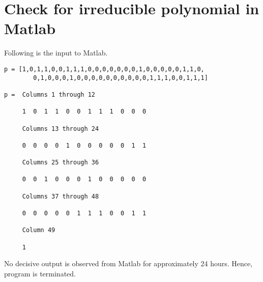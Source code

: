 \chapter{Check for irreducible polynomial in Matlab}
\label{app:appendixA}
Following is the input to Matlab.
 
\begin{lstlisting}[frame=tb]
p = [1,0,1,1,0,0,1,1,1,0,0,0,0,0,0,0,1,0,0,0,0,0,1,1,0,
		0,1,0,0,0,1,0,0,0,0,0,0,0,0,0,0,1,1,1,0,0,1,1,1]

p =  Columns 1 through 12

     1  0  1  1  0  0  1  1  1  0  0  0

  	 Columns 13 through 24

     0  0  0  0  1  0  0  0  0  0  1  1

     Columns 25 through 36

     0  0  1  0  0  0  1  0  0  0  0  0

     Columns 37 through 48

     0  0  0  0  0  1  1  1  0  0  1  1

     Column 49

     1
\end{lstlisting}

No decisive output is observed from Matlab for approximately 24 hours. Hence, program is terminated.